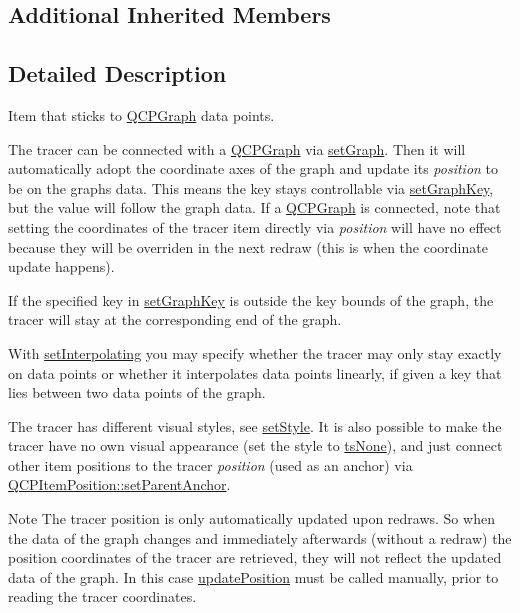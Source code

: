 \subsection*{Additional Inherited Members}


\subsection{Detailed Description}
Item that sticks to \mbox{\hyperlink{class_q_c_p_graph}{Q\+C\+P\+Graph}} data points. 

 The tracer can be connected with a \mbox{\hyperlink{class_q_c_p_graph}{Q\+C\+P\+Graph}} via \mbox{\hyperlink{class_q_c_p_item_tracer_af5886f4ded8dd68cb4f3388f390790c0}{set\+Graph}}. Then it will automatically adopt the coordinate axes of the graph and update its {\itshape position} to be on the graph\textquotesingle{}s data. This means the key stays controllable via \mbox{\hyperlink{class_q_c_p_item_tracer_a6840143b42f3b685cedf7c6d83a704c8}{set\+Graph\+Key}}, but the value will follow the graph data. If a \mbox{\hyperlink{class_q_c_p_graph}{Q\+C\+P\+Graph}} is connected, note that setting the coordinates of the tracer item directly via {\itshape position} will have no effect because they will be overriden in the next redraw (this is when the coordinate update happens).

If the specified key in \mbox{\hyperlink{class_q_c_p_item_tracer_a6840143b42f3b685cedf7c6d83a704c8}{set\+Graph\+Key}} is outside the key bounds of the graph, the tracer will stay at the corresponding end of the graph.

With \mbox{\hyperlink{class_q_c_p_item_tracer_a6c244a9d1175bef12b50afafd4f5fcd2}{set\+Interpolating}} you may specify whether the tracer may only stay exactly on data points or whether it interpolates data points linearly, if given a key that lies between two data points of the graph.

The tracer has different visual styles, see \mbox{\hyperlink{class_q_c_p_item_tracer_a41a2ac4f1acd7897b4e2a2579c03204e}{set\+Style}}. It is also possible to make the tracer have no own visual appearance (set the style to \mbox{\hyperlink{class_q_c_p_item_tracer_a2f05ddb13978036f902ca3ab47076500aac27462c79146225bfa8fba24d2ee8a4}{ts\+None}}), and just connect other item positions to the tracer {\itshape position} (used as an anchor) via \mbox{\hyperlink{class_q_c_p_item_position_ac094d67a95d2dceafa0d50b9db3a7e51}{Q\+C\+P\+Item\+Position\+::set\+Parent\+Anchor}}.

\begin{DoxyNote}{Note}
The tracer position is only automatically updated upon redraws. So when the data of the graph changes and immediately afterwards (without a redraw) the position coordinates of the tracer are retrieved, they will not reflect the updated data of the graph. In this case \mbox{\hyperlink{class_q_c_p_item_tracer_a5b90296109e36384aedbc8908a670413}{update\+Position}} must be called manually, prior to reading the tracer coordinates. 
\end{DoxyNote}


